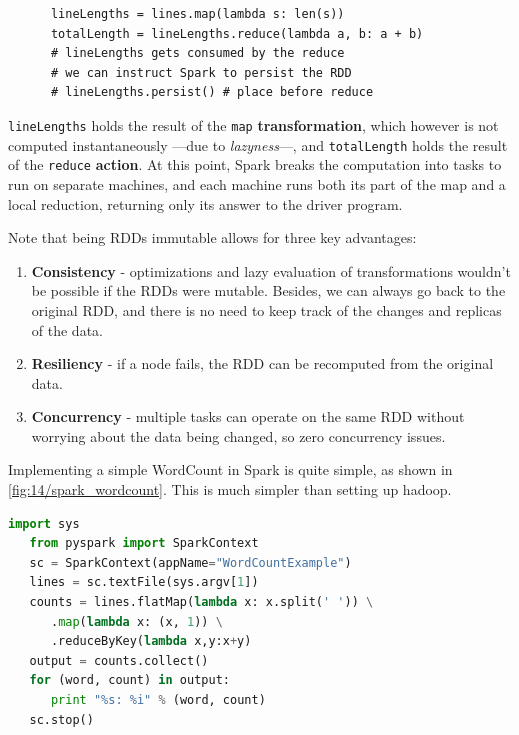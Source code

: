 \begin{paracol}{2}
   \begin{lstlisting}
      lineLengths = lines.map(lambda s: len(s))
      totalLength = lineLengths.reduce(lambda a, b: a + b)
      # lineLengths gets consumed by the reduce
      # we can instruct Spark to persist the RDD
      # lineLengths.persist() # place before reduce

   \end{lstlisting}
   
   \switchcolumn

   \lstinline|lineLengths| holds the result of the \lstinline|map| \textbf{transformation}, which however is not computed instantaneously ---due to \textit{lazyness}---, and \lstinline|totalLength| holds the result of the \lstinline|reduce| \textbf{action}.
   At this point, 
   Spark breaks the computation into tasks to run on
   separate machines, and each machine runs both its part of the map and a local reduction, returning only its answer to the driver program.
\end{paracol}


Note that being RDDs immutable allows for three key advantages:
\begin{enumerate}
   \item \textbf{Consistency} - optimizations and lazy evaluation of transformations wouldn't be possible if the RDDs were mutable. 
   Besides, we can always go back to the original RDD, and there is no need to keep track of the changes and replicas of the data.
   \item \textbf{Resiliency} - if a node fails, the RDD can be recomputed from the original data.
   \item \textbf{Concurrency} - multiple tasks can operate on the same RDD without worrying about the data being changed, so zero concurrency issues.
\end{enumerate}


Implementing a simple WordCount in Spark is quite simple, as shown in \autoref{fig:14/spark_wordcount}.
This is much simpler than setting up hadoop.
\begin{lstlisting}[language=Python, caption={Spark WordCount example}]
   import sys
   from pyspark import SparkContext
   sc = SparkContext(appName="WordCountExample")
   lines = sc.textFile(sys.argv[1])
   counts = lines.flatMap(lambda x: x.split(' ')) \
      .map(lambda x: (x, 1)) \
      .reduceByKey(lambda x,y:x+y)
   output = counts.collect()
   for (word, count) in output:
      print "%s: %i" % (word, count)
   sc.stop()
\end{lstlisting}
